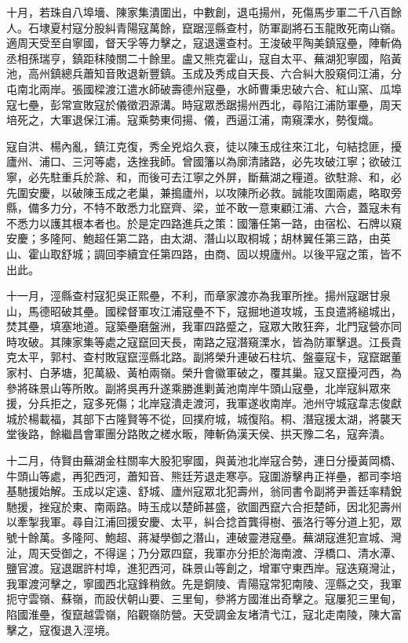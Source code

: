 \begin{pinyinscope}
十月，若珠自八埠墻、陳家集潰圍出，中數創，退屯揚州，死傷馬步軍二千八百餘人。石埭夏村寇分股糾青陽寇萬餘，竄踞涇縣查村，防軍副將石玉龍敗死南山嶺。適周天受至自寧國，督天孚等力擊之，寇退還查村。王浚破平陶美鎮寇壘，陣斬偽丞相孫瑞亨，鎮距秣陵關二十餘里。盧又熊克霍山，寇自太平、蕪湖犯寧國，陷黃池，高州鎮總兵蕭知音敗退新豐鎮。玉成及秀成自天長、六合糾大股窺伺江浦，分屯南北兩岸。張國樑渡江遣水師破壽德州寇壘，水師曹秉忠破六合、紅山窯、瓜埠寇七壘，彭常宣敗寇於儀徵泗源溝。時寇眾悉踞揚州西北，尋陷江浦防軍壘，周天培死之，大軍退保江浦。寇乘勢東伺揚、儀，西逼江浦，南窺溧水，勢復熾。

寇自洪、楊內亂，鎮江克復，秀全兇焰久衰，徒以陳玉成往來江北，句結捻匪，擾廬州、浦口、三河等處，迭挫我師。曾國籓以為廓清諸路，必先攻破江寧；欲破江寧，必先駐重兵於滁、和，而後可去江寧之外屏，斷蕪湖之糧道。欲駐滁、和，必先圍安慶，以破陳玉成之老巢，兼搗廬州，以攻陳所必救。誠能攻圍兩處，略取旁縣，備多力分，不特不敢悉力北竄齊、梁，並不敢一意東顧江浦、六合，蓋寇未有不悉力以護其根本者也。於是定四路進兵之策：國籓任第一路，由宿松、石牌以窺安慶；多隆阿、鮑超任第二路，由太湖、潛山以取桐城；胡林翼任第三路，由英山、霍山取舒城；調回李續宜任第四路，由商、固以規廬州。以後平寇之策，皆不出此。

十一月，涇縣查村寇犯吳正熙壘，不利，而章家渡亦為我軍所挫。揚州寇踞甘泉山，馬德昭破其壘。國樑督軍攻江浦寇壘不下，寇掘地道攻城，玉良遣將縋城出，焚其壘，填塞地道。寇築壘磨盤洲，我軍四路蹙之，寇眾大敗狂奔，北門寇營亦同時攻破。其陳家集等處之寇竄回天長，南路之寇潛窺溧水，皆為防軍擊退。江長貴克太平，郭村、查村敗寇竄涇縣北路。副將榮升連破石柱坑、盤臺寇卡，寇竄踞董家村、白茅塘，犯萬級、黃柏兩嶺。榮升會徽軍破之，覆其巢。寇又竄擾河西，為參將硃景山等所敗。副將吳再升遂乘勝進剿黃池南岸牛頭山寇壘，北岸寇糾眾來援，分兵拒之，寇多死傷；北岸寇潰走渡河，我軍遂收南岸。池州守城寇韋志俊獻城於楊載福，其部下古隆賢等不從，回撲府城，城復陷。桐、潛寇援太湖，將襲天堂後路，餘繼昌會軍團分路敗之槎水畈，陣斬偽漢天侯、拱天豫二名，寇奔潰。

十二月，侍賢由蕪湖金柱關率大股犯寧國，與黃池北岸寇合勢，連日分擾黃岡橋、牛頭山等處，再犯西河，蕭知音、熊廷芳退走寒亭。寇圍游擊冉正祥壘，都司李培基馳援始解。玉成以定遠、舒城、廬州寇眾北犯壽州，翁同書令副將尹善廷率精銳馳援，挫寇於東、南兩路。時玉成以楚師甚盛，欲圖西竄六合拒楚師，因北犯壽州以牽掣我軍。尋自江浦回援安慶、太平，糾合捻首龔得樹、張洛行等分道上犯，眾號十餘萬。多隆阿、鮑超、蔣凝學御之潛山，連破靈港寇壘。蕪湖寇進犯宣城、灣沚，周天受御之，不得逞；乃分眾四竄，我軍亦分拒於海南渡、浮橋口、清水潭、鹽官渡。寇退踞許村埠，進犯西河，硃景山等創之，增軍守東西岸。寇迭窺灣沚，我軍渡河擊之，寧國西北寇鋒稍斂。先是銅陵、青陽寇常犯南陵、涇縣之交，我軍扼守雲嶺、蘇嶺，而設伏朝山要、三里甸，參將方國淮出奇擊之。寇屢犯三里甸，陷國淮壘，復竄越雲嶺，陷觀嶺防營。天受調金友堵清弋江，寇北走南陵，陳大富擊之，寇復退入涇境。


\end{pinyinscope}
